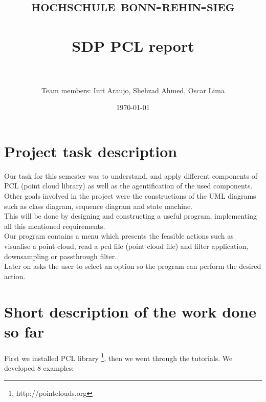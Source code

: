\documentclass[paper=a4, fontsize=12pt]{scrartcl} %
\title{	
\normalfont \normalsize 
\textsc{hochschule bonn-rehin-sieg} \\ [25pt] %
\horrule{0.5pt} \\[0.4cm] %
\huge SDP PCL report \\ %
\horrule{2pt} \\[0.5cm] %
}
\author{Team members: Iuri Araujo, Shehzad Ahmed, Oscar Lima} %
\date{\normalsize\today} %
\numberwithin{equation}{section} %
\numberwithin{figure}{section} %
\numberwithin{table}{section} %
\begin{document}
\maketitle %


\section{Project task description}

Our task for this semester was to understand, and apply different components of PCL (point cloud library) as well as the agentification of the used components.
\\[10pt]
Other goals involved in the project were the constructions of the UML diagrams such as class diagram, sequence diagram and state machine.
\\[10pt]
This will be done by designing and constructing a useful program, implementing all this mentioned requirements.
\\[10pt]
Our program contains a menu which presents the feasible actions such as visualise a point cloud, read a pcd file (point cloud file) and filter application, downsampling or passthrough filter.
\\[10pt]
Later on asks the user to select an option so the program can perform the desired action.
\\[10pt]


\section{Short description of the work done so far}

First we installed PCL library \footnote{http://pointclouds.org}, then we went through the tutorials. We developed 8 examples:
\\[10pt]
\end{document}
